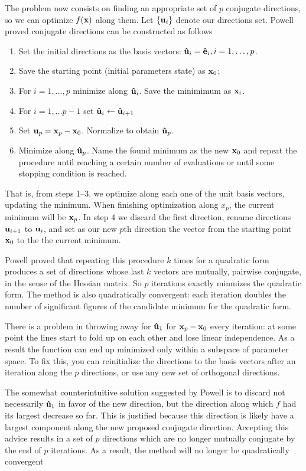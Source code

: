 The problem now consists on finding an appropriate set of $p$ conjugate directions, so we can optimize $f(\vb{x})$ along them. Let $\{\vb{u}_i\}$ denote our directions set. Powell proved conjugate directions can be constructed as follows
\begin{enumerate}
    \item Set the initial directions as the basis vectors: $\vu{u}_i=\vu{e}_i, i=1,\dots, p$.
    \item Save the starting point (initial parameters state) as $\vb{x}_0$;
    \item For $i=1,\dots, p$ minimize along $\vu{u}_i$. Save the minimimum as $\vb{x}_i$.
    \item For $i=1,\dots p-1$ set $\vu{u}_i\leftarrow\vu{u}_{i+1}$
    \item Set $\vb{u}_p=\vb{x}_p - \vb{x}_0$. Normalize to obtain $\vu{u}_p$.
    \item Minimize along $\vu{u}_p$. Name the found minimum as the new $\vb{x}_0$ and repeat the procedure until reaching a certain number of evaluations or until some stopping condition is reached.
\end{enumerate}

That is, from steps 1--3. we optimize along each one of the unit basis vectors, updating the minimum. When finishing optimization along ${x}_p$, the current minimum will be $\vb{x}_p$. In step 4 we discard the first direction, rename directions $\vb{u}_{i+1}$ to $\vb{u}_i$, and set as our new $p$th direction the vector from the starting point $\vb{x}_0$ to the the current minimum.

Powell proved that repeating this procedure $k$ times for a quadratic form produces a set of directions whose last $k$ vectors are mutually, pairwise conjugate, in the sense of the Hessian matrix. So $p$ iterations exactly minmizes the quadratic form. The method is also quadratically convergent: each iteration doubles the number of significant figures of the candidate minimum for the quadratic form.

There is a problem in throwing away  for $\vu{u}_1$ for $\vb{x}_p - \vb{x}_0$ every iteration: at some point the lines start to fold up on each other and lose linear independence. As a result the function can end up minimized only within a subspace of parameter space. To fix this, you can reinitialize the directions to the basis vectors after an iteration along the $p$ directions, or use any new set of orthogonal directions.

The somewhat counterintuitive solution suggested by Powell is to discard not necessarily $\vu{u}_1$ in favor of the new direction, but the direction along which $f$ had its largest decrease so far. This is justified because this direction is likely have a largest component along the new proposed conjugate direction. Accepting this advice results in a set of $p$ directions which are no longer mutually conjugate by the end of $p$ iterations. As a result, the method will no longer be quadratically convergent

